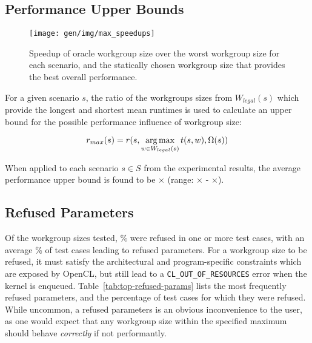 \subsection{Performance Upper Bounds}

\begin{figure}
\texttt{[image: gen/img/max\_speedups]}
\caption{%
  Speedup of oracle workgroup size over the worst workgroup size for
  each scenario, and the statically chosen workgroup size that
  provides the best overall performance.%
}
\label{fig:speedups}
\end{figure}

For a given scenario $s$, the ratio of the workgroups sizes from
$W_{legal}(s)$ which provide the longest and shortest mean runtimes is
used to calculate an upper bound for the possible performance
influence of workgroup size:

\begin{equation}
r_{max}(s) = r(s, \operatorname*{arg\,max}_{w \in W_{legal}(s)} t(s,w), \Omega(s))
\end{equation}

When applied to each scenario $s \in S$ from the experimental results,
the average performance upper bound is found to be
$\times$ (range:
$\times$ -
$\times$).



\subsection{Refused Parameters}

Of the  workgroup sizes tested,
\% were refused in one or more test
cases, with an average \% of test
cases leading to refused parameters. For a workgroup size to be
refused, it must satisfy the architectural and program-specific
constraints which are exposed by OpenCL, but still lead to a
\texttt{CL\_OUT\_OF\_RESOURCES} error when the kernel is
enqueued. Table~\ref{tab:top-refused-params} lists the most frequently
refused parameters, and the percentage of test cases for which they
were refused. While uncommon, a refused parameters is an obvious
inconvenience to the user, as one would expect that any workgroup size
within the specified maximum should behave \emph{correctly} if not
performantly.

